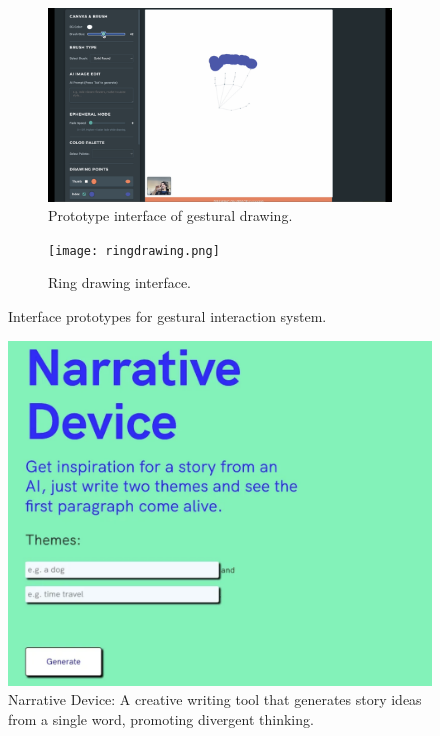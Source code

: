 \begin{figure}[htbp]
    \centering

    \begin{subfigure}[b]{1\textwidth}
        \centering
        \includegraphics[width=\textwidth]{gesturedraw.png}
        \caption{Prototype interface of gestural drawing.}
        \label{fig:gesturedraw}
    \end{subfigure}
    \hfill

    \begin{subfigure}[b]{1\textwidth}
        \centering
        \texttt{[image: ringdrawing.png]}
        \caption{Ring drawing interface.}
        \label{fig:ringdrawing}
    \end{subfigure}

    \caption{Interface prototypes for gestural interaction system.}
    \label{fig:combined_interfaces}
\end{figure}

\begin{figure}
    \centering
    \includegraphics[width=1\linewidth]{narrativedeice.png}
    \caption{Narrative Device: A creative writing tool that generates story ideas from a single word, promoting divergent thinking.}
    \label{fig:enter-label}
\end{figure}



